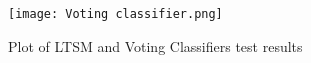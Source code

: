 \documentclass[11pt]{article}
\begin{document}
\begin{figure}[htbp]
\centering
\texttt{[image: Voting classifier.png]}
\caption{Plot of LTSM and Voting Classifiers test results}
\label{fig:image_label}
\end{figure}


\end{document}
